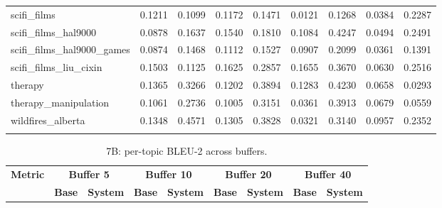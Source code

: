 \begin{landscape}
\begin{longtable}{@{}p{3.8cm}cccccccc@{}}
scifi\_films & 0.1211 & 0.1099 & 0.1172 & 0.1471 & 0.0121 & 0.1268 & 0.0384 & 0.2287 \\
scifi\_films\_hal9000 & 0.0878 & 0.1637 & 0.1540 & 0.1810 & 0.1084 & 0.4247 & 0.0494 & 0.2491 \\
scifi\_films\_hal9000\_games & 0.0874 & 0.1468 & 0.1112 & 0.1527 & 0.0907 & 0.2099 & 0.0361 & 0.1391 \\
scifi\_films\_liu\_cixin & 0.1503 & 0.1125 & 0.1625 & 0.2857 & 0.1655 & 0.3670 & 0.0630 & 0.2516 \\
therapy & 0.1365 & 0.3266 & 0.1202 & 0.3894 & 0.1283 & 0.4230 & 0.0658 & 0.0293 \\
therapy\_manipulation & 0.1061 & 0.2736 & 0.1005 & 0.3151 & 0.0361 & 0.3913 & 0.0679 & 0.0559 \\
wildfires\_alberta & 0.1348 & 0.4571 & 0.1305 & 0.3828 & 0.0321 & 0.3140 & 0.0957 & 0.2352 \\
\botrule
\end{longtable}
\begin{longtable}{@{}p{3.8cm}cccccccc@{}}
\caption{7B: per-topic BLEU-2 across buffers.}\label{tab:app_7b_bleu_topics}\\

\toprule
\textbf{Metric} & \multicolumn{2}{c}{\textbf{Buffer 5}} & \multicolumn{2}{c}{\textbf{Buffer 10}} & \multicolumn{2}{c}{\textbf{Buffer 20}} & \multicolumn{2}{c}{\textbf{Buffer 40}} \\
\cmidrule(lr){2-3}\cmidrule(lr){4-5}\cmidrule(lr){6-7}\cmidrule(lr){8-9}
 & \textbf{Base} & \textbf{System} & \textbf{Base} & \textbf{System} & \textbf{Base} & \textbf{System} & \textbf{Base} & \textbf{System} \\
\midrule
\endfirsthead


\end{longtable}
\end{landscape}
